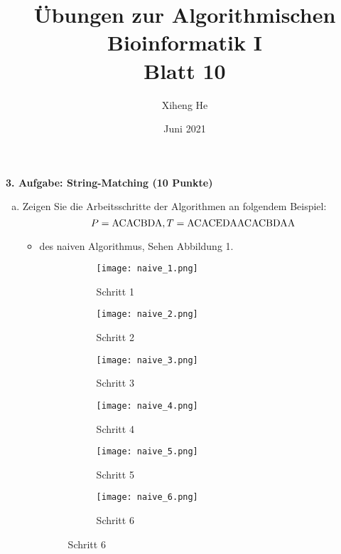 \documentclass{article}
\title{Übungen zur Algorithmischen Bioinformatik I\\
Blatt 10}
\author{Xiheng He}
\date{Juni 2021}
\begin{document}
\maketitle
\begin{flushleft}
\textbf{3. Aufgabe: String-Matching (10 Punkte)}
\begin{enumerate}[(a)]
    \item Zeigen Sie die Arbeitsschritte der Algorithmen an folgendem Beispiel:
    \begin{equation*}
        P = {\rm ACACBDA}, T = {\rm ACACEDAACACBDAA}
    \end{equation*}
    \begin{itemize}
        \item des naiven Algorithmus,
        \newline 
        Sehen Abbildung 1.
        \begin{figure}
            \centering
            \begin{subfigure}{0.3\textwidth}
                \centering
                \texttt{[image: naive\_1.png]}
                \caption{Schritt 1}
            \end{subfigure}
            \begin{subfigure}{0.3\textwidth}
                \centering
                \texttt{[image: naive\_2.png]}
                \caption{Schritt 2}
            \end{subfigure}
            \begin{subfigure}{0.3\textwidth}
                \centering
                \texttt{[image: naive\_3.png]}
                \caption{Schritt 3}
            \end{subfigure}
            \begin{subfigure}{0.3\textwidth}
                \centering
                \texttt{[image: naive\_4.png]}
                \caption{Schritt 4}
            \end{subfigure}
            \begin{subfigure}{0.3\textwidth}
                \centering
                \texttt{[image: naive\_5.png]}
                \caption{Schritt 5}
            \end{subfigure}
            \begin{subfigure}{0.3\textwidth}
                \centering
                \texttt{[image: naive\_6.png]}
                \caption{Schritt 6}
            \end{subfigure}

\end{figure}
\end{itemize}
\end{enumerate}
\end{flushleft}
\end{document}
